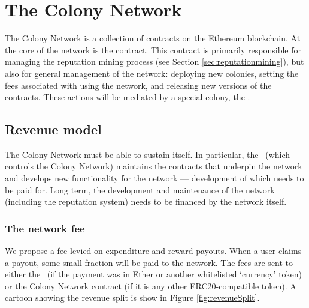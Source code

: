 \section{The Colony Network}\label{sec:colonynetwork}

The Colony Network is a collection of contracts on the Ethereum blockchain. At the core of the network is the  contract. This contract is primarily responsible for managing the reputation mining process (see Section \ref{sec:reputationmining}), but also for general management of the network: deploying new colonies, setting the fees associated with using the network, and releasing new versions of the  contracts. These actions will be mediated by a special colony, the \rc.

\subsection{Revenue model}\label{sec:networkrevenue}

The Colony Network must be able to sustain itself. In particular, the \rc\ (which controls the Colony Network) maintains the contracts that underpin the network and develops new functionality for the network --- development of which needs to be paid for. Long term, the development and maintenance of the network (including the reputation system) needs to be financed by the network itself.

\subsubsection{The network fee}\label{sec:networkfee}

We propose a fee levied on expenditure and reward payouts. When a user claims a payout, some small fraction will be paid to the network. The fees are sent to either the \rc\ (if the payment was in Ether or another whitelisted `currency' token) or the Colony Network contract (if it is any other ERC20-compatible token). A cartoon showing the revenue split is show in Figure \ref{fig:revenueSplit}.

